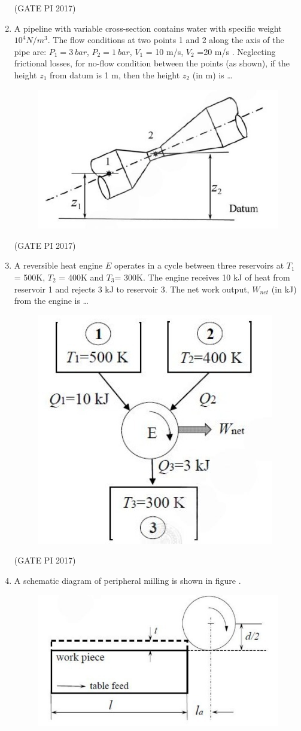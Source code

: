 \documentclass[journal,12pt,onecolumn]{IEEEtran}
\theoremstyle{remark}
\begin{document}
\begin{enumerate}
\hfill (GATE PI 2017)

\item A pipeline with variable cross\--section contains water with specific weight $10^4 N/m^3$.  
The flow conditions at two points 1 and 2 along the axis of the pipe are:  
$P_1 = 3\ bar$, $P_2 = 1\ bar$, $V_1$ = 10 m/s, $V_2$ =20 m/s .  
Neglecting frictional losses, for no\--flow condition between the points (as shown), if the height $z_1$ from datum is 1 m,  
then the height $z_2$ (in m) is \dots

\begin{figure}[H]
    \centering
    \includegraphics[width=0.4\columnwidth]{fig7.png}
    \caption{}
    \label{fig:placeholder}
\end{figure}


\hfill (GATE PI 2017)

\item A reversible heat engine $E$ operates in a cycle between three reservoirs at  
$T_{1}$ = 500K, $T_{2}$ = 400K and $T_{3} $= 300K.  
The engine receives 10 kJ of heat from reservoir 1 and rejects 3 kJ to reservoir 3.  
The net work output, $W_{{net}}$ (in kJ) from the engine is \dots 

\begin{figure}[H]
    \centering
    \includegraphics[width=0.5\columnwidth]{fig8.png}
    \caption{}
    \label{fig:placeholder}
\end{figure}

\hfill (GATE PI 2017)

\item A schematic diagram of peripheral milling is shown in figure .
\begin{figure}[H]
    \centering
    \includegraphics[width=0.4\columnwidth]{fig6.png}
    \caption{}
    \label{fig:placeholder}
\end{figure}



\end{enumerate}
\end{document}
